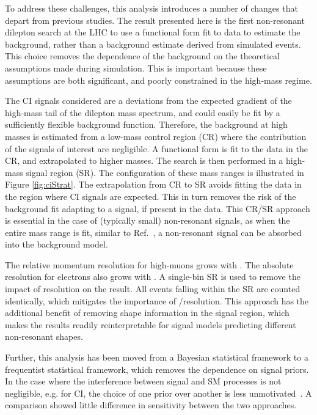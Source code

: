 To address these challenges, this analysis introduces a number of changes that depart from previous studies.
The result presented here is the first non-resonant dilepton search at the LHC to use a functional form fit to data to estimate the background, rather than a background estimate derived from simulated events.
This choice removes the dependence of the background on the theoretical assumptions made during simulation.
This is important because these assumptions are both significant, and poorly constrained in the high-mass regime.

The CI signals considered are a deviations from the expected gradient of the high-mass tail of the dilepton mass spectrum, and could easily be fit by a sufficiently flexible background function.
Therefore, the background at high masses is estimated from a low-mass control region (CR) where the contribution of the signals of interest are negligible.
A functional form is fit to the data in the CR, and extrapolated to higher masses.
The search is then performed in a high-mass signal region (SR).
The configuration of these mass ranges is illustrated in Figure \ref{fig:ciStrat}.
The extrapolation from CR to SR avoids fitting the data in the region where CI signals are expected.
This in turn removes the risk of the background fit adapting to a signal, if present in the data.
This CR/SR approach is essential in the case of (typically small) non-resonant signals, as when the entire mass range is fit, similar to Ref.~\cite{Aad:2019fac}, a non-resonant signal can be absorbed into the background model.

The relative momentum resolution for high-\pt muons grows with \pt.
The absolute \et resolution for electrons also grows with \et.
A single-bin SR is used to remove the impact of resolution on the result.
All events falling within the SR are counted identically, which mitigates the importance of \et/\pt resolution.
This approach has the additional benefit of removing shape information in the signal region, which makes the results readily reinterpretable for signal models predicting different non-resonant shapes.

Further, this analysis has been moved from a Bayesian statistical framework to a frequentist statistical framework, which removes the dependence on signal priors.
In the case where the interference between signal and SM processes is not negligible, e.g. for CI, the choice of one prior over another is less unmotivated~\cite{Aad:2012hf,EXOT-2016-05}.
A comparison showed little difference in sensitivity between the two approaches.

